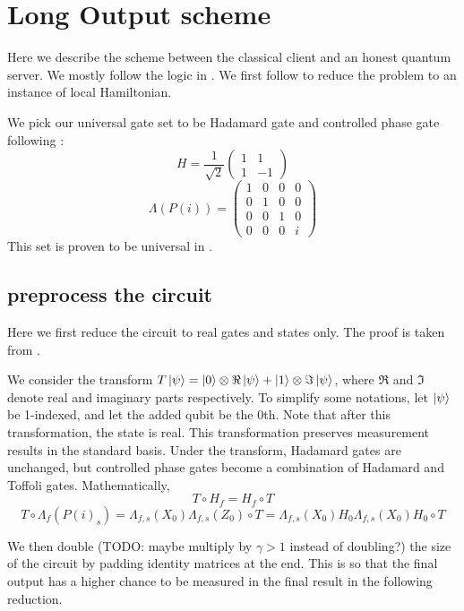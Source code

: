 \section{Long Output scheme}

Here we describe the scheme between the classical client and an honest quantum server. We mostly follow the logic in \cite{mahadev_delegation}. We first follow \cite{kempe_kitaev_regev_2006} to reduce the problem to an instance of local Hamiltonian.

We pick our universal gate set to be Hadamard gate and controlled phase gate following \cite{quant-ph/0301040}:
$$H=\frac{1}{\sqrt{2}}\begin{pmatrix}1&1\\1&-1\end{pmatrix}$$
$$\Lambda(P(i))=\begin{pmatrix}1&0&0&0\\0&1&0&0\\0&0&1&0\\0&0&0&i\end{pmatrix}$$
This set is proven to be universal in \cite{kitaev_1997}.

\subsection{preprocess the circuit}

Here we first reduce the circuit to real gates and states only. The proof is taken from \cite{quant-ph/0301040}.

We consider the transform $T\ket{\psi}=\ket{0}\otimes\Re\ket{\psi}+\ket{1}\otimes\Im\ket{\psi}$, where $\Re$ and $\Im$ denote real and imaginary parts respectively. To simplify some notations, let $\ket{\psi}$ be 1-indexed, and let the added qubit be the 0th. Note that after this transformation, the state is real. This transformation preserves measurement results in the standard basis. Under the transform, Hadamard gates are unchanged, but controlled phase gates become a combination of Hadamard and Toffoli gates. Mathematically,
$$T\circ H_f=H_f\circ T$$
$$T\circ\Lambda_f(P(i)_s)=\Lambda_{f,s}(X_0)\Lambda_{f,s}(Z_0)\circ T=\Lambda_{f,s}(X_0)H_0\Lambda_{f,s}(X_0)H_0\circ T$$

We then double (TODO: maybe multiply by $\gamma>1$ instead of doubling?) the size of the circuit by padding identity matrices at the end. This is so that the final output has a higher chance to be measured in the final result in the following reduction.

